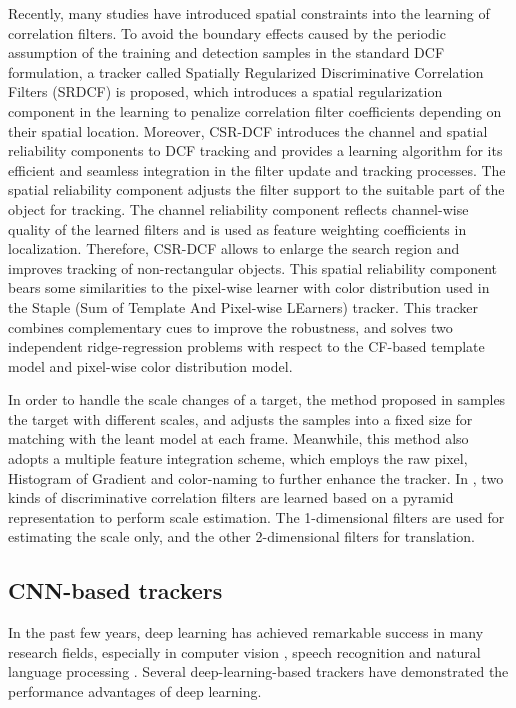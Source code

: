 \documentclass[review]{elsarticle}
\begin{document}
\begin{CJK*}{UTF8}{gbsn}
Recently, many studies \cite{Danelljan2015LearningSR, Lukezic2017DiscriminativeCF} have introduced spatial constraints into the learning of correlation filters.
To avoid the boundary effects caused by the periodic assumption of the training and detection samples in the standard DCF formulation, a tracker called Spatially Regularized Discriminative Correlation Filters (SRDCF) \cite{Danelljan2015LearningSR} is proposed, which introduces a spatial regularization component in the learning to penalize correlation filter coefficients depending on their spatial location.
Moreover, CSR-DCF \cite{Lukezic2017DiscriminativeCF} introduces the channel and spatial reliability components to DCF tracking and provides a learning algorithm for its efficient and seamless integration in the filter update and tracking processes. The spatial reliability component adjusts the filter support to the suitable part of the object for tracking. The channel reliability component reflects channel-wise quality of the learned filters and is used as feature weighting coefficients in localization. Therefore, CSR-DCF allows to enlarge the search region and improves tracking of non-rectangular objects. This spatial reliability component bears some similarities to the pixel-wise learner with color distribution used in the Staple (Sum of Template And  Pixel-wise LEarners) \cite{Bertinetto2016StapleC} tracker. This tracker combines complementary cues to improve the robustness, and solves two independent ridge-regression problems with respect to the CF-based template model and pixel-wise color distribution model.

In order to handle the scale changes of a target, the method proposed in \cite{Li2014ASA} samples the target with different scales, and adjusts the samples into a fixed size for matching with the leant model at each frame. Meanwhile, this method also adopts a multiple feature integration scheme, which employs the raw pixel, Histogram of Gradient \cite{Forsyth2014ObjectDW} and color-naming \cite{Weijer2009LearningCN} to further enhance the tracker.
In \cite{Danelljan2017DiscriminativeSS}, two kinds of discriminative correlation filters are learned based on a pyramid representation to perform scale estimation. The 1-dimensional filters are used for estimating the scale only, and the other 2-dimensional filters for translation.

\subsection{CNN-based trackers}
In the past few years, deep learning \cite{Goodfellow2015DeepL} has achieved remarkable success in many research fields, especially in computer vision \cite{Girshick2016RegionBasedCN, Schroff2015FaceNetAU}, speech recognition \cite{Kim2016JointCB, Wu2015DeepNN} and natural language processing \cite{Vinyals2014GrammarAA, Bahdanau2014NeuralMT}. Several deep-learning-based trackers have demonstrated the performance advantages of deep learning. 


\end{CJK*}
\end{document}
